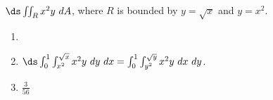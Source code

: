 {$\ds \iint_R x^2y\ dA$, where $R$ is bounded by $y=\sqrt{x}$ and $y=x^2$.
}
{\begin{enumerate}
\item \noindent \begin{minipage}{.9\linewidth}
\end{minipage}
\item	$\ds  \int_0^1\int_{x^2}^{\sqrt{x}}x^2y\ dy\ dx = \int_0^1\int_{y^2}^{\sqrt{y}}x^2y\ dx\ dy$.
\item	$\frac3{56}$
\end{enumerate}
}
